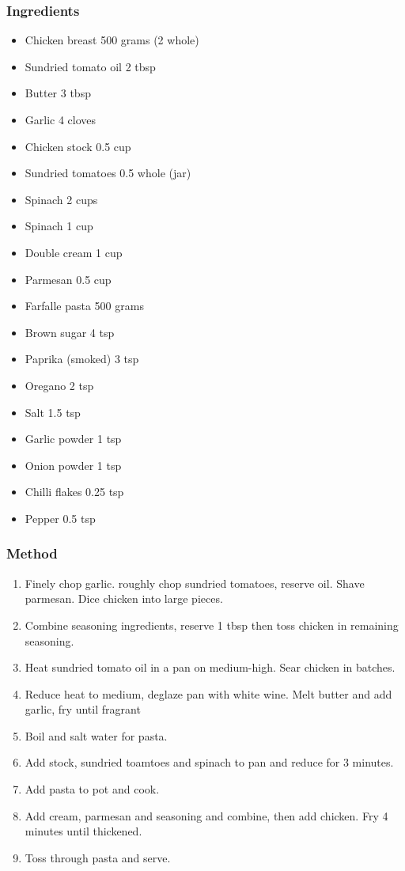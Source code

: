 \documentclass[]{article}
\begin{document}
\subsubsection*{\Large Ingredients}
\begin{multicols}{2}
\begin{itemize}
 \item Chicken breast \hfill 500 grams (2 whole)
 \item Sundried tomato oil \hfill 2 tbsp
 \item Butter \hfill 3 tbsp
 \item Garlic \hfill 4 cloves
 \item Chicken stock \hfill 0.5 cup
 \item Sundried tomatoes \hfill 0.5 whole (jar)
 \item Spinach \hfill 2 cups
 \item Spinach \hfill 1 cup
 \item Double cream \hfill 1 cup
 \item Parmesan \hfill 0.5 cup
 \item Farfalle pasta \hfill 500 grams
 \item Brown sugar \hfill 4 tsp
 \item Paprika (smoked) \hfill 3 tsp
 \item Oregano \hfill 2 tsp
 \item Salt \hfill 1.5 tsp
 \item Garlic powder \hfill 1 tsp
 \item Onion powder \hfill 1 tsp
 \item Chilli flakes \hfill 0.25 tsp
 \item Pepper \hfill 0.5 tsp
\end{itemize}
\end{multicols}
\subsubsection*{\Large Method}
\begin{enumerate}[font=\huge\color{accent}]
	\item Finely chop garlic. roughly chop sundried tomatoes, reserve oil. Shave parmesan. Dice chicken into large pieces.
	\item Combine seasoning ingredients, reserve 1 tbsp then toss chicken in remaining seasoning.
	\item Heat sundried tomato oil in a pan on medium-high. Sear chicken in batches.
	\item Reduce heat to medium, deglaze pan with white wine. Melt butter and add garlic, fry until fragrant
	\item Boil and salt water for pasta.
	\item Add stock, sundried toamtoes and spinach to pan and reduce for 3 minutes.
	\item Add pasta to pot and cook.
	\item Add cream, parmesan and seasoning and combine, then add chicken. Fry 4 minutes until thickened.
	\item Toss through pasta and serve.
\end{enumerate}
\newpage
{}
\end{document}
